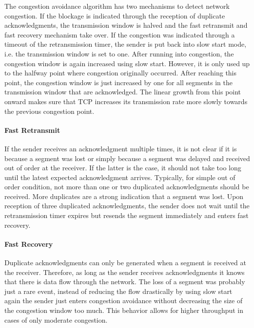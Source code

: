 The congestion avoidance algorithm has two mechanisms to detect network congestion. If the blockage is indicated through the reception of duplicate acknowledgments, the transmission window is halved and the fast retransmit and fast recovery mechanism take over. If the congestion was indicated through a timeout of the retransmission timer, the sender is put back into slow start mode, i.e. the transmission window is set to one. After running into congestion, the congestion window is again increased using slow start. However, it is only used up to the halfway point where congestion originally occurred. After reaching this point, the congestion window is just increased by one for all segments in the transmission window that are acknowledged. The linear growth from this point onward makes sure that TCP increases its transmission rate more slowly towards the previous congestion point.  

\paragraph{Fast Retransmit}

If the sender receives an acknowledgment multiple times, it is not clear if it is because a segment was lost or simply because a segment was delayed and received out of order at the receiver. If the latter is the case, it should not take too long until the latest expected acknowledgment arrives. Typically, for simple out of order condition, not more than one or two duplicated acknowledgments should be received. More duplicates are a strong indication that a segment was lost. Upon reception of three duplicated acknowledgments, the sender does not wait until the retransmission timer expires but resends the segment immediately and enters fast recovery.

\paragraph{Fast Recovery}

Duplicate acknowledgments can only be generated when a segment is received at the receiver. Therefore, as long as the sender receives acknowledgments it knows that there is data flow through the network. The loss of a segment was probably just a rare event, instead of reducing the flow drastically by using slow start again the sender just enters congestion avoidance without decreasing the size of the congestion window too much. This behavior allows for higher throughput in cases of only moderate congestion.

